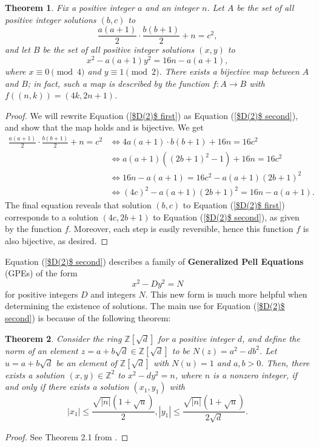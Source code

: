 \documentclass[12pt]{amsart}
\theoremstyle{theorem}
\newtheorem{theorem}{Theorem}
\theoremstyle{definition}
\theoremstyle{plain}
\begin{document}
\begin{theorem}
    Fix a positive integer $a$ and an integer $n$. Let $A$ be the set of all positive integer solutions $(b,c)$ to \begin{equation}\label{$D(2)$ first}
         \frac{a(a+1)}{2} \cdot \frac{b(b+1)}{2} + n = c^2,
    \end{equation} 
    and let $B$ be the set of all positive integer solutions $(x,y)$ to 
    \begin{equation} \label{$D(2)$ second}
    x^2 - a(a+1) y^2 = 16n - a(a+1),
    \end{equation}
    where $x \equiv 0 \pmod{4}$ and $y \equiv 1 \pmod{2}$. There exists a bijective map between $A$ and $B$; in fact, such a map is described by the function $f: A \to B$ with $f((n,k)) = (4k, 2n+1)$. 
\end{theorem}
\begin{proof}
    We will rewrite Equation (\ref{$D(2)$ first}) as Equation (\ref{$D(2)$ second}), and show that the map holds and is bijective. We get 
    \begin{align*}
    \frac{a(a+1)}{2} \cdot \frac{b(b+1)}{2} + n = c^2 &\iff 4a(a+1) \cdot b(b+1) + 16n = 16c^2 \\
    &\iff a(a+1) ((2b+1)^2 - 1) + 16n = 16c^2 \\
    &\iff 16n - a(a+1) = 16c^2 - a(a+1)(2b+1)^2 \\
    &\iff (4c)^2 - a(a+1)(2b+1)^2 = 16n - a(a+1).
    \end{align*}
    The final equation reveals that solution $(b,c)$ to Equation (\ref{$D(2)$ first}) corresponds to a solution $(4c, 2b+1)$ to Equation (\ref{$D(2)$ second}), as given by the function $f$. Moreover, each step is easily reversible, hence this function $f$ is also bijective, as desired.
\end{proof}

Equation (\ref{$D(2)$ second}) describes a family of \textbf{Generalized Pell Equations} (GPEs) of the form $$x^2 - Dy^2 = N$$ for positive integers $D$ and integers $N$. This new form is much more helpful when determining the existence of solutions. The main use for Equation (\ref{$D(2)$ second}) is because of the following theorem:

\begin{theorem}\label{Bounding Theorem}
    Consider the ring $\mathbb{Z}[\sqrt{d}]$ for a positive integer $d$, and define the norm of an element $z = a + b \sqrt{d} \in \mathbb{Z}[\sqrt{d}]$ to be $N(z) = a^2 - db^2$. Let $u = a + b\sqrt{d}$ be an element of $\mathbb{Z}[\sqrt{d}]$ with $N(u) = 1$ and $a, b > 0$. Then, there exists a solution $(x,y) \in \mathbb{Z}^2$ to $x^2 - dy^2 = n$, where $n$ is a nonzero integer, if and only if there exists a solution $(x_1, y_1)$ with 
    \begin{equation}\label{Bounded}
    |x_1| \le \frac{\sqrt{\left|n\right|} (1 + \sqrt{u})}{2}, |y_1| \le \frac{\sqrt{\left|n\right|} (1 + \sqrt{u})}{2 \sqrt{d}}.
    \end{equation}
\end{theorem}
\begin{proof}
    See Theorem 2.1 from \cite{b7}.
\end{proof}
\end{document}

